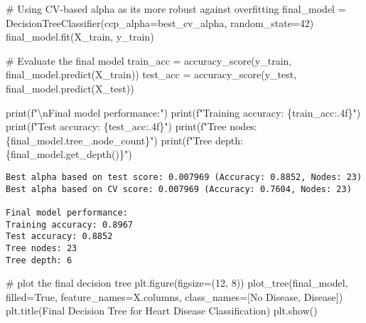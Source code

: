 \documentclass[
  letterpaper,
  DIV=11,
  numbers=noendperiod]{scrreprt}
\newenvironment{Shaded}{\begin{snugshade}}{\end{snugshade}}
\newcommand{\BuiltInTok}[1]{\textcolor[rgb]{0.00,0.23,0.31}{#1}}
\newcommand{\CharTok}[1]{\textcolor[rgb]{0.13,0.47,0.30}{#1}}
\newcommand{\CommentTok}[1]{\textcolor[rgb]{0.37,0.37,0.37}{#1}}
\newcommand{\DecValTok}[1]{\textcolor[rgb]{0.68,0.00,0.00}{#1}}
\newcommand{\NormalTok}[1]{\textcolor[rgb]{0.00,0.23,0.31}{#1}}
\newcommand{\OperatorTok}[1]{\textcolor[rgb]{0.37,0.37,0.37}{#1}}
\newcommand{\SpecialCharTok}[1]{\textcolor[rgb]{0.37,0.37,0.37}{#1}}
\newcommand{\SpecialStringTok}[1]{\textcolor[rgb]{0.13,0.47,0.30}{#1}}
\newcommand{\StringTok}[1]{\textcolor[rgb]{0.13,0.47,0.30}{#1}}
\newcommand{\VariableTok}[1]{\textcolor[rgb]{0.07,0.07,0.07}{#1}}
\begin{document}
\begin{Shaded}
\begin{Highlighting}[]
\CommentTok{\# Using CV{-}based alpha as it\textquotesingle{}s more robust against overfitting}
\NormalTok{final\_model }\OperatorTok{=}\NormalTok{ DecisionTreeClassifier(ccp\_alpha}\OperatorTok{=}\NormalTok{best\_cv\_alpha, random\_state}\OperatorTok{=}\DecValTok{42}\NormalTok{)}
\NormalTok{final\_model.fit(X\_train, y\_train)}

\CommentTok{\# Evaluate the final model}
\NormalTok{train\_acc }\OperatorTok{=}\NormalTok{ accuracy\_score(y\_train, final\_model.predict(X\_train))}
\NormalTok{test\_acc }\OperatorTok{=}\NormalTok{ accuracy\_score(y\_test, final\_model.predict(X\_test))}

\BuiltInTok{print}\NormalTok{(}\SpecialStringTok{f"}\CharTok{\textbackslash{}n}\SpecialStringTok{Final model performance:"}\NormalTok{)}
\BuiltInTok{print}\NormalTok{(}\SpecialStringTok{f"Training accuracy: }\SpecialCharTok{\{}\NormalTok{train\_acc}\SpecialCharTok{:.4f\}}\SpecialStringTok{"}\NormalTok{)}
\BuiltInTok{print}\NormalTok{(}\SpecialStringTok{f"Test accuracy: }\SpecialCharTok{\{}\NormalTok{test\_acc}\SpecialCharTok{:.4f\}}\SpecialStringTok{"}\NormalTok{)}
\BuiltInTok{print}\NormalTok{(}\SpecialStringTok{f"Tree nodes: }\SpecialCharTok{\{}\NormalTok{final\_model}\SpecialCharTok{.}\NormalTok{tree\_}\SpecialCharTok{.}\NormalTok{node\_count}\SpecialCharTok{\}}\SpecialStringTok{"}\NormalTok{)}
\BuiltInTok{print}\NormalTok{(}\SpecialStringTok{f"Tree depth: }\SpecialCharTok{\{}\NormalTok{final\_model}\SpecialCharTok{.}\NormalTok{get\_depth()}\SpecialCharTok{\}}\SpecialStringTok{"}\NormalTok{)}
\end{Highlighting}
\end{Shaded}

\begin{verbatim}
Best alpha based on test score: 0.007969 (Accuracy: 0.8852, Nodes: 23)
Best alpha based on CV score: 0.007969 (Accuracy: 0.7604, Nodes: 23)

Final model performance:
Training accuracy: 0.8967
Test accuracy: 0.8852
Tree nodes: 23
Tree depth: 6
\end{verbatim}

\begin{Shaded}
\begin{Highlighting}[]
\CommentTok{\# plot the final decision tree}
\NormalTok{plt.figure(figsize}\OperatorTok{=}\NormalTok{(}\DecValTok{12}\NormalTok{, }\DecValTok{8}\NormalTok{))}
\NormalTok{plot\_tree(final\_model, filled}\OperatorTok{=}\VariableTok{True}\NormalTok{, feature\_names}\OperatorTok{=}\NormalTok{X.columns, class\_names}\OperatorTok{=}\NormalTok{[}\StringTok{\textquotesingle{}No Disease\textquotesingle{}}\NormalTok{, }\StringTok{\textquotesingle{}Disease\textquotesingle{}}\NormalTok{])}
\NormalTok{plt.title(}\StringTok{\textquotesingle{}Final Decision Tree for Heart Disease Classification\textquotesingle{}}\NormalTok{)}
\NormalTok{plt.show()}
\end{Highlighting}
\end{Shaded}
\end{document}
